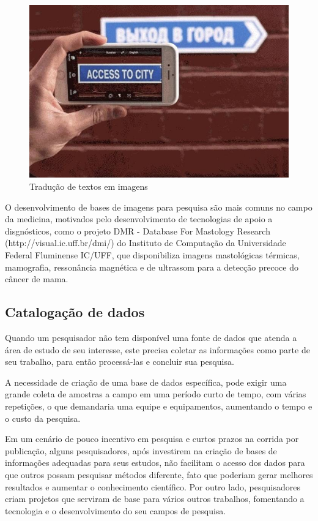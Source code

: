 \begin{figure}[htb]
	\caption{Tradução de textos em imagens}
	\begin{center}
		\includegraphics[scale=0.3]{img/google_tradutor.jpeg}
	\end{center}
\end{figure}


O desenvolvimento de bases de imagens para pesquisa são mais comuns no campo da medicina, motivados pelo desenvolvimento de tecnologias de apoio a disgnósticos, como o projeto DMR - Database For Mastology Research (http://visual.ic.uff.br/dmi/) do Instituto de Computação da Universidade Federal Fluminense IC/UFF, que disponibiliza imagens mastológicas térmicas, mamografia, ressonância magnética e de ultrassom para a detecção precoce do câncer de mama.


\subsection{Catalogação de dados}

Quando um pesquisador não tem disponível uma fonte de dados que atenda a área de estudo de seu interesse, este precisa coletar as informações como parte de seu trabalho, para então processá-las e concluir sua pesquisa.

A necessidade de criação de uma base de dados específica, pode exigir uma grande coleta de amostras a campo em uma período curto de tempo, com várias repetições, o que demandaria uma equipe e equipamentos, aumentando o tempo e o custo da pesquisa.

Em um cenário de pouco incentivo em pesquisa e curtos prazos na corrida por publicação, alguns pesquisadores, após investirem na criação de bases de informações adequadas para seus estudos, não facilitam o acesso dos dados para que outros possam pesquisar métodos diferente, fato que poderiam gerar melhores resultados e aumentar o conhecimento científico. Por outro lado, pesquisadores criam projetos que serviram de base para vários outros trabalhos, fomentando a tecnologia e o desenvolvimento do seu campos de pesquisa.

